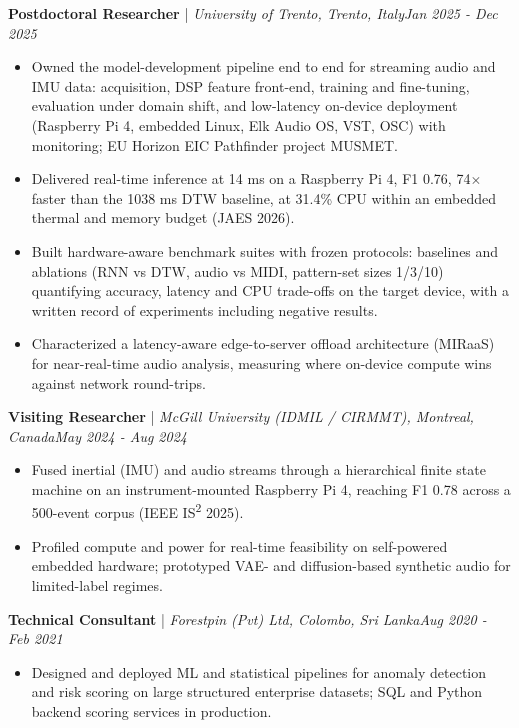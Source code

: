 \documentclass[11pt]{article}
\newenvironment{cvrole}[5]{%
  \par\noindent\textbf{\large #1} | \textit{\small #2, #3}\hfill \textit{\small #4 - #5}\par
  \begin{itemize}[leftmargin=2em, itemsep=-0.3em, topsep=-0.5em]%
}{%
  \end{itemize}\par\noindent\mbox{}\par\vspace{0.1em}%
}
\begin{document}
\begin{cvrole}{Postdoctoral Researcher}{University of Trento}{Trento, Italy}{Jan 2025}{Dec 2025}
    \item Owned the model-development pipeline end to end for streaming audio and IMU data: acquisition, DSP feature front-end, training and fine-tuning, evaluation under domain shift, and low-latency on-device deployment (Raspberry Pi 4, embedded Linux, Elk Audio OS, VST, OSC) with monitoring; EU Horizon EIC Pathfinder project MUSMET.
    \item Delivered real-time inference at 14 ms on a Raspberry Pi 4, F1 0.76, 74$\times$ faster than the 1038 ms DTW baseline, at 31.4\% CPU within an embedded thermal and memory budget (JAES 2026).
    \item Built hardware-aware benchmark suites with frozen protocols: baselines and ablations (RNN vs DTW, audio vs MIDI, pattern-set sizes 1/3/10) quantifying accuracy, latency and CPU trade-offs on the target device, with a written record of experiments including negative results.
    \item Characterized a latency-aware edge-to-server offload architecture (MIRaaS) for near-real-time audio analysis, measuring where on-device compute wins against network round-trips.
\end{cvrole}

\begin{cvrole}{Visiting Researcher}{McGill University (IDMIL / CIRMMT)}{Montreal, Canada}{May 2024}{Aug 2024}
    \item Fused inertial (IMU) and audio streams through a hierarchical finite state machine on an instrument-mounted Raspberry Pi 4, reaching F1 0.78 across a 500-event corpus (IEEE IS\textsuperscript{2} 2025).
    \item Profiled compute and power for real-time feasibility on self-powered embedded hardware; prototyped VAE- and diffusion-based synthetic audio for limited-label regimes.
\end{cvrole}

\begin{cvrole}{Technical Consultant}{Forestpin (Pvt) Ltd}{Colombo, Sri Lanka}{Aug 2020}{Feb 2021}
    \item Designed and deployed ML and statistical pipelines for anomaly detection and risk scoring on large structured enterprise datasets; SQL and Python backend scoring services in production.
\end{cvrole}
\end{document}
